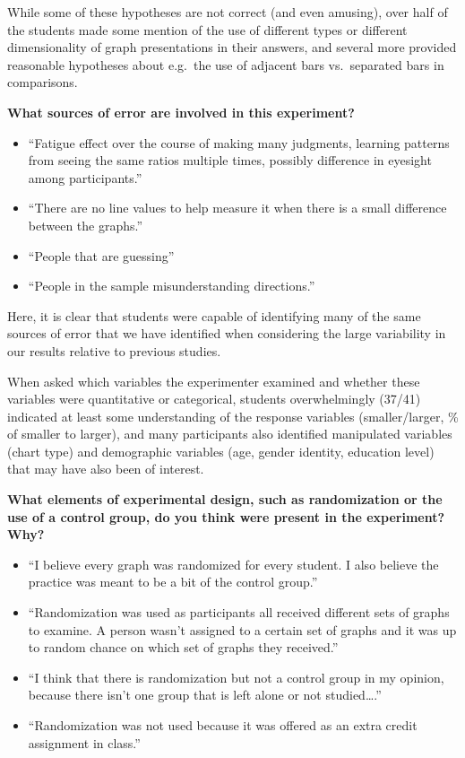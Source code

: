 \documentclass[runningheads
]{llncs}
\providecommand{\tightlist}{%
  \setlength{\itemsep}{0pt}\setlength{\parskip}{0pt}}\usepackage{longtable,booktabs,array}
\begin{document}
While some of these hypotheses are not correct (and even amusing), over
half of the students made some mention of the use of different types or
different dimensionality of graph presentations in their answers, and
several more provided reasonable hypotheses about e.g.~the use of
adjacent bars vs.~separated bars in comparisons.

\textbf{What sources of error are involved in this experiment?}

\begin{itemize}
\tightlist
\item
  ``Fatigue effect over the course of making many judgments, learning
  patterns from seeing the same ratios multiple times, possibly
  difference in eyesight among participants.''
\item
  ``There are no line values to help measure it when there is a small
  difference between the graphs.''
\item
  ``People that are guessing''
\item
  ``People in the sample misunderstanding directions.''
\end{itemize}

Here, it is clear that students were capable of identifying many of the
same sources of error that we have identified when considering the large
variability in our results relative to previous studies.

When asked which variables the experimenter examined and whether these
variables were quantitative or categorical, students overwhelmingly
(37/41) indicated at least some understanding of the response variables
(smaller/larger, \% of smaller to larger), and many participants also
identified manipulated variables (chart type) and demographic variables
(age, gender identity, education level) that may have also been of
interest.

\textbf{What elements of experimental design, such as randomization or
the use of a control group, do you think were present in the experiment?
Why?}

\begin{itemize}
\tightlist
\item
  ``I believe every graph was randomized for every student. I also
  believe the practice was meant to be a bit of the control group.''
\item
  ``Randomization was used as participants all received different sets
  of graphs to examine. A person wasn't assigned to a certain set of
  graphs and it was up to random chance on which set of graphs they
  received.''
\item
  ``I think that there is randomization but not a control group in my
  opinion, because there isn't one group that is left alone or not
  studied\ldots.''
\item
  ``Randomization was not used because it was offered as an extra credit
  assignment in class.''
\end{itemize}
\end{document}
